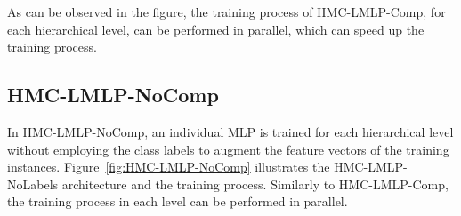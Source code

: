 
As can be observed in the figure, the training process of HMC-LMLP-Comp, for each hierarchical level, can be performed in parallel, which can speed up the training process.

\subsection{HMC-LMLP-NoComp}

In HMC-LMLP-NoComp, an individual MLP is trained for each hierarchical level without employing the class labels to augment the feature vectors of the training instances. Figure~\ref{fig:HMC-LMLP-NoComp} illustrates the HMC-LMLP-NoLabels architecture and the training process. Similarly to HMC-LMLP-Comp, the training process in each level can be performed in parallel.



